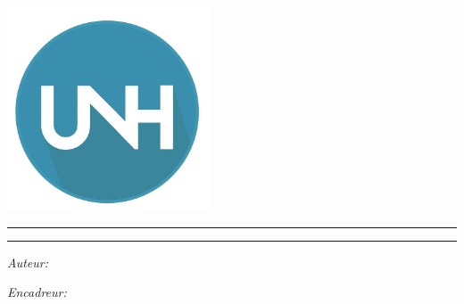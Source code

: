 
\begin{titlepage}

\begin{center}
\large

\vspace*{.06\textheight}


 
{\Huge{{\textsc{\myUni}}} }\\
\vspace{1.5cm} 
\includegraphics[width=6cm]{gfx/official_unh_logo1} \\ \medskip %


\begin{center}
	\rule{0.9\textwidth}{.2pt}
\end{center}
\vspace{0.2cm}
{\huge \bfseries \myTitle}%
\begin{center}
	\rule{0.9\textwidth}{.2pt}
\end{center}


\begin{minipage}[t]{0.5\textwidth}
	\begin{flushleft} \large
		\emph{Auteur:}\\
		\href{http://www.unhorizons.org}{\myName} %
	\end{flushleft}
\end{minipage}
\begin{minipage}[t]{0.4\textwidth}
	\begin{flushright} \large
		\emph{Encadreur:} \\
		\href{http://www.kamotocoppercompany.com}{\mySupervisor} %
	\end{flushright}
\end{minipage}\\[3cm]


\end{center}
\end{titlepage}

